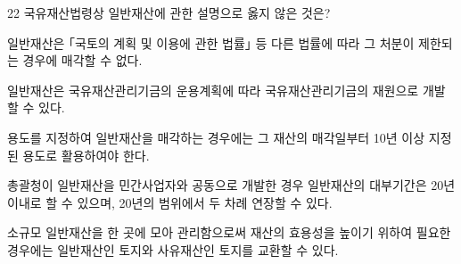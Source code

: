 \begin{question}{22}
국유재산법령상 일반재산에 관한 설명으로 옳지 않은 것은?
\begin{choices}
  \item 일반재산은 ｢국토의 계획 및 이용에 관한 법률｣ 등 다른 법률에 따라 그 처분이 제한되는 경우에 매각할 수 없다.
  \item 일반재산은 국유재산관리기금의 운용계획에 따라 국유재산관리기금의 재원으로 개발할 수 있다.
  \item 용도를 지정하여 일반재산을 매각하는 경우에는 그 재산의 매각일부터 10년 이상 지정된 용도로 활용하여야 한다.
  \item 총괄청이 일반재산을 민간사업자와 공동으로 개발한 경우 일반재산의 대부기간은 20년 이내로 할 수 있으며, 20년의 범위에서 두 차례 연장할 수 있다.
  \item 소규모 일반재산을 한 곳에 모아 관리함으로써 재산의 효용성을 높이기 위하여 필요한 경우에는 일반재산인 토지와 사유재산인 토지를 교환할 수 있다.
\end{choices}
\end{question}
